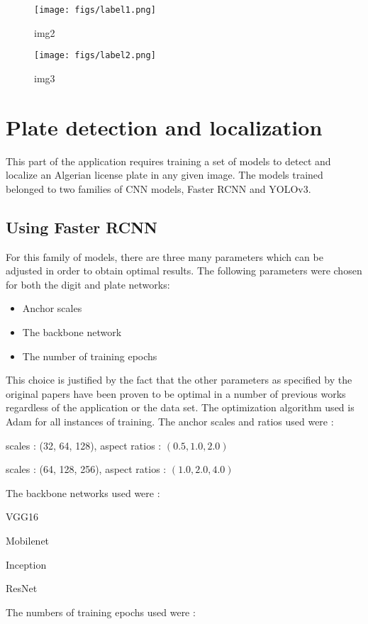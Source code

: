 \begin{figure}[!htpb]
	\centering
	\texttt{[image: figs/label1.png]}
	\caption{img2}\label{fig:label1}
\end{figure}

\begin{figure}[!htpb]
	\centering
	\texttt{[image: figs/label2.png]}
	\caption{img3}\label{fig:label2}
\end{figure}

\section{Plate detection and localization}
This part of the application requires training a set of models to detect and localize an Algerian license plate in any given image. The models trained belonged to two families of CNN models, Faster RCNN and YOLOv3.

\subsection{Using Faster RCNN}
For this family of models, there are three  many parameters which can be adjusted in order to obtain optimal results. The following parameters were chosen for both the digit and plate networks:

\begin{itemize}
	\item Anchor scales
	\item The backbone network
	\item The number of training epochs
\end{itemize}

This choice is justified by the fact that the other parameters as specified by the original papers have been proven to be optimal in a number of previous works regardless of the application or the data set.
The optimization algorithm used is Adam for all instances of training. The anchor scales and ratios used were :

\begin{compactitem}
	\item scales : (32, 64, 128), aspect ratios : $(0.5, 1.0, 2.0)$
	\item scales : (64, 128, 256), aspect ratios : $(1.0, 2.0, 4.0)$
\end{compactitem}
The backbone networks used were :

\begin{compactitem}
	\item VGG16
	\item Mobilenet
	\item Inception
	\item ResNet
\end{compactitem}
The numbers of training epochs used were :


